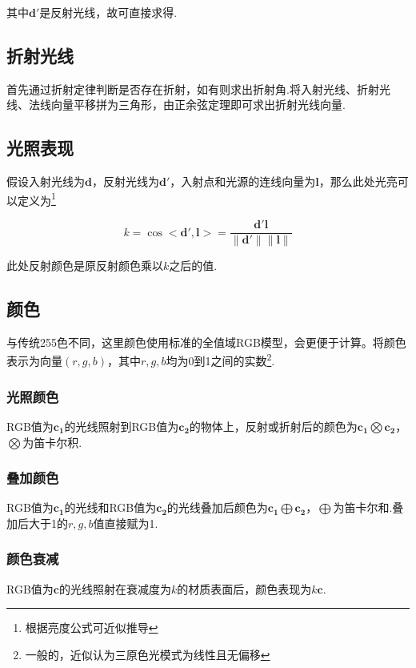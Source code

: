 \documentclass[10pt,twocolumn]{article}
\begin{document}
其中$\mathbf{d'}$是反射光线，故可直接求得.

\subsection{\hei 折射光线}
首先通过折射定律判断是否存在折射，如有则求出折射角.将入射光线、折射光线、法线向量平移拼为三角形，由正余弦定理即可求出折射光线向量.

\subsection{\hei 光照表现}
假设入射光线为$\mathbf{d}$，反射光线为$\mathbf{d'}$，入射点和光源的连线向量为$\mathbf{l}$，那么此处光亮可以定义为\footnote{根据亮度公式可近似推导}

\begin{equation}
k=\cos{<\mathbf{d'},\mathbf{l}>}=\frac{\mathbf{d'l}}{\mathbf{\|d'\|\|l\|}}
\end{equation}

此处反射颜色是原反射颜色乘以$k$之后的值.

\subsection{\hei 颜色}
与传统255色不同，这里颜色使用标准的全值域RGB模型，会更便于计算。将颜色表示为向量$(r,g,b)$，其中$r,g,b$均为0到1之间的实数\footnote{一般的，近似认为三原色光模式为线性且无偏移}.

\subsubsection{\hei 光照颜色}
RGB值为$\mathbf{c_1}$的光线照射到RGB值为$\mathbf{c_2}$的物体上，反射或折射后的颜色为$\mathbf{c_1}\bigotimes\mathbf{c_2}$，$\bigotimes $为笛卡尔积.

\subsubsection{\hei 叠加颜色}
RGB值为$\mathbf{c_1}$的光线和RGB值为$\mathbf{c_2}$的光线叠加后颜色为$\mathbf{c_1}\bigoplus\mathbf{c_2}$，$\bigoplus $为笛卡尔和.叠加后大于1的$r,g,b$值直接赋为1.

\subsubsection{\hei 颜色衰减}
RGB值为$\mathbf{c}$的光线照射在衰减度为$k$的材质表面后，颜色表现为$k\mathbf{c}$.
\end{document}
